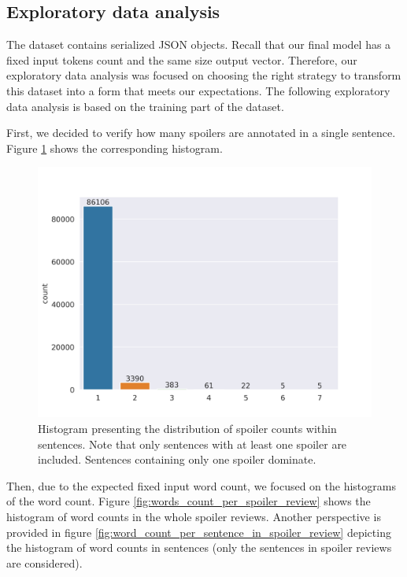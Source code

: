 \documentclass[11pt]{article}
\begin{document}
\subsection{Exploratory data analysis} \label{eda}

The dataset contains serialized JSON objects. Recall that our final model has a fixed input tokens count and the same size output vector. Therefore, our exploratory data analysis was focused on choosing the right strategy to transform this dataset into a form that meets our expectations. The following exploratory data analysis is based on the training part of the dataset.

First, we decided to verify how many spoilers are annotated in a single sentence. Figure \ref{fig:spoilers-per-sentence} shows the corresponding histogram.

\begin{figure}
    \centering
    \includegraphics[width=\columnwidth]{img/eda/spoilers_per_sentence.png}
    \caption{Histogram presenting the distribution of spoiler counts within sentences. Note that only sentences with at least one spoiler are included. Sentences containing only one spoiler dominate.} 
    \label{fig:spoilers-per-sentence}
\end{figure}

Then, due to the expected fixed input word count, we focused on the histograms of the word count. Figure \ref{fig:words_count_per_spoiler_review} shows the histogram of word counts in the whole spoiler reviews. Another perspective is provided in figure \ref{fig:word_count_per_sentence_in_spoiler_review} depicting the histogram of word counts in sentences (only the sentences in spoiler reviews are considered). 
\end{document}
